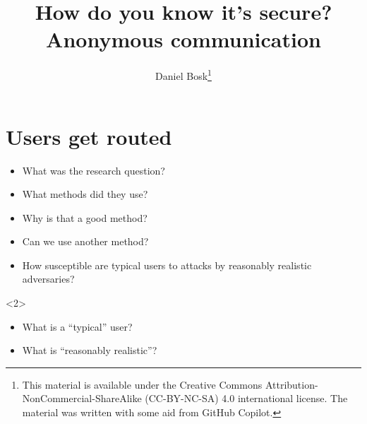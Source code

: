 \title{%
  How do you know it's secure?
  Anonymous communication
}
\author{Daniel Bosk\thanks{%
    This material is available under the Creative Commons 
    Attribution-NonCommercial-ShareAlike (CC-BY-NC-SA) 4.0 international 
    license.
    The material was written with some aid from GitHub Copilot.
}}

\begin{frame}
  \maketitle
\end{frame}

\mode*

\begin{abstract}
  
\end{abstract}

\clearpage


\section{Users get routed}

\begin{frame}
  \begin{question}
    \begin{itemize}
      \item What was the research question?
      \item What methods did they use?
      \item Why is that a good method?
      \item Can we use another method?
    \end{itemize}
  \end{question}
\end{frame}

\begin{frame}
  \begin{solution}
    \begin{itemize}
      \item How susceptible are \alert<2>{typical} users to attacks by 
        \alert<2>{reasonably realistic} adversaries?
    \end{itemize}
  \end{solution}

  \begin{uncoverenv}<2>
  \begin{question}
    \begin{itemize}
      \item What is a \enquote{typical} user?
      \item What is \enquote{reasonably realistic}?
    \end{itemize}
  \end{question}
  \end{uncoverenv}
\end{frame}

